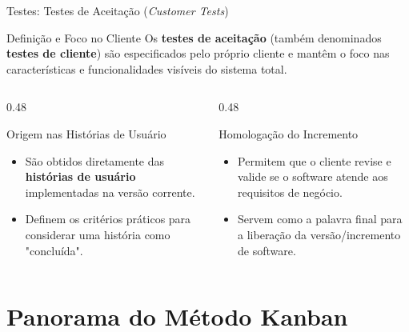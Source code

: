 \documentclass[aspectratio=169, 9pt]{beamer}
\begin{document}
\begin{frame}{Testes: Testes de Aceitação (\textit{Customer Tests})}
  \begin{block}{Definição e Foco no Cliente}
    Os \textbf{testes de aceitação} (também denominados \textbf{testes de cliente}) são especificados pelo próprio cliente e mantêm o foco nas características e funcionalidades visíveis do sistema total.
  \end{block}

  \vspace{0.3cm}

  \begin{columns}[T]
    \begin{column}{0.48\textwidth}
      \begin{exampleblock}{Origem nas Histórias de Usuário}
        \begin{itemize}
          \item São obtidos diretamente das \textbf{histórias de usuário} implementadas na versão corrente.
          \item Definem os critérios práticos para considerar uma história como "concluída".
        \end{itemize}
      \end{exampleblock}
    \end{column}

    \begin{column}{0.48\textwidth}
      \begin{block}{Homologação do Incremento}
        \begin{itemize}
          \item Permitem que o cliente revise e valide se o software atende aos requisitos de negócio.
          \item Servem como a palavra final para a liberação da versão/incremento de software.
        \end{itemize}
      \end{block}
    \end{column}
  \end{columns}
\end{frame}


\section{Panorama do Método Kanban}
\end{document}
